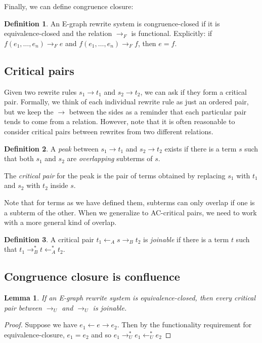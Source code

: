 \documentclass[12pt,a4paper,twoside,openright]{report}
\numberwithin{equation}{chapter}		%
\numberwithin{figure}{chapter}			%
\numberwithin{table}{chapter}			%
\theoremstyle{definition}
\newtheorem*{definition}{Definition}
\theoremstyle{plain}
\newtheorem{lemma}{Lemma}
\begin{document}
Finally, we can define congruence closure:

\begin{definition}
An E-graph rewrite system is congruence-closed if it is equivalence-closed and the relation $\rightarrow_F$ is functional. Explicitly: if $f(e_1, \ldots, e_n) \rightarrow_F e$ and $f(e_1, \ldots, e_n) \rightarrow_F f$, then $e = f$.
\end{definition}

\subsection{Critical pairs} \label{critpairs}
Given two rewrite rules $s_1 \rightarrow t_1$ and $s_2 \rightarrow t_2$, we can ask if they form a critical pair. Formally, we think of each individual rewrite rule as just an ordered pair, but we keep the $\rightarrow$ between the sides as a reminder that each particular pair tends to come from a relation. However, note that it is often reasonable to consider critical pairs between rewrites from two different relations.

\begin{definition} \label{peak}
A \emph{peak} between $s_1 \rightarrow t_1$ and $s_2 \rightarrow t_2$ exists if there is a term $s$ such that both $s_1$ and $s_2$ are \emph{overlapping} subterms of $s$.

The \emph{critical pair} for the peak is the pair of terms obtained by replacing $s_1$ with $t_1$ and $s_2$ with $t_2$ inside $s$.
\end{definition}

Note that for terms as we have defined them, subterms can only overlap if one is a subterm of the other. When we generalize to AC-critical pairs, we need to work with a more general kind of overlap.

\begin{definition}
A critical pair $t_1 \leftarrow_A s \rightarrow_B t_2$ is \emph{joinable} if there is a term $t$ such that $t_1 \rightarrow^*_B t \leftarrow^*_A t_2$. 
\end{definition}

\subsection{Congruence closure is confluence}
\begin{lemma}
If an E-graph rewrite system is equivalence-closed, then every critical pair between $\rightarrow_U$ and $\rightarrow_U$ is joinable.
\end{lemma}
\begin{proof}
Suppose we have $e_1 \leftarrow e \rightarrow e_2$. Then by the functionality requirement for equivalence-closure, $e_1 = e_2$ and so $e_1 \rightarrow^*_U e_1 \leftarrow^*_U e_2$ 
\end{proof}
\end{document}
